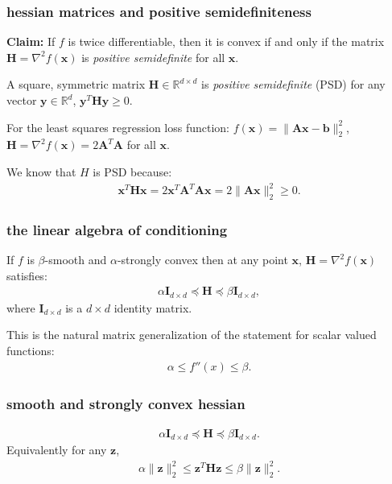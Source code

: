 \documentclass[compress]{beamer}
\newcommand{\bv}[1]{\mathbf{#1}}
\newcommand{\R}{\mathbb{R}}
\begin{document}
\begin{frame}[t]
	\frametitle{hessian matrices and positive semidefiniteness}
	\textbf{Claim:} If $f$ is twice differentiable, then it is convex if and only if the matrix $\bv{H} = \nabla^2 f(\bv{x})$ is \emph{positive semidefinite} for all $\bv{x}$. 
	
	\begin{definition}
		A square, symmetric matrix $\bv{H}\in \R^{d\times d}$ is \emph{positive semidefinite} (PSD) for any vector $\bv{y}\in \R^d$, $\bv{y}^T\bv{H}\bv{y} \geq 0$. 
	\end{definition}
	
	For the least squares regression loss function: $f(\bv{x}) = \|\bv{A}\bv{x} - \bv{b}\|_2^2$, $\bv{H} = \nabla^2 f(\bv{x})= 2\bv{A}^T\bv{A}$ for all $\bv{x}$. 
	
	We know that $H$ is PSD because:
	\begin{align*}
		\bv{x}^T\bv{H}\bv{x} = 2\bv{x}^T\bv{A}^T\bv{A}\bv{x} =  2\|\bv{A}\bv{x}\|_2^2 \geq 0.
	\end{align*}
\end{frame}

\begin{frame}[t]
	\frametitle{the linear algebra of conditioning}
	If $f$ is $\beta$-smooth and $\alpha$-strongly convex then at any point $\bv{x}$, $\bv{H} = \nabla^2 f(\bv{x})$ satisfies: 
	\begin{align*}
		\alpha\bv{I}_{d\times d} \preceq \bv{H} \preceq \beta\bv{I}_{d\times d},
	\end{align*}
	where $\bv{I}_{d\times d}$ is a $d\times d$ identity matrix. 
	
	This is the natural matrix generalization of the statement for scalar valued functions:
	\begin{align*}
		\alpha \leq f''(x)\leq \beta.
	\end{align*}
	
\end{frame}

\begin{frame}[t]
	\frametitle{smooth and strongly convex hessian}
	\begin{align*}
		\alpha\bv{I}_{d\times d} \preceq \bv{H} \preceq \beta\bv{I}_{d\times d}.
	\end{align*}
	Equivalently for any $\bv{z}$,
	\begin{align*}
		\alpha\|\bv{z}\|_2^2 \leq \bv{z}^T\bv{H}\bv{z} \leq \beta\|\bv{z}\|_2^2.
	\end{align*} 
\end{frame}
\end{document}

